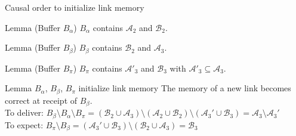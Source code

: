 \documentclass[10pt, xcolor={usenames, dvipsnames}]{beamer}
\begin{document}
\begin{frame}{Causal order to initialize link memory}

  \begin{center}
    
  \end{center}

  \vspace{-1em}

  \begin{minipage}{0.325\textwidth}
    \begin{block}{Lemma (Buffer $B_\alpha$)}
      $B_\alpha$ contains $\mathcal{A}_2$ and $\mathcal{B}_2$.
    \end{block}
  \end{minipage}
  \begin{minipage}{0.325\textwidth}
    \begin{block}{Lemma (Buffer $B_\beta$)}
      $B_\beta$ contains $\mathcal{B}_2$ and $\mathcal{A}_3$.
    \end{block}
  \end{minipage}
  \begin{minipage}{0.325\textwidth}
    \begin{block}{Lemma (Buffer $B_\pi$)}
      $B_\pi$ contains $\mathcal{A'}_3$ and $\mathcal{B}_3$ with 
      $\mathcal{A}'_3 \subseteq \mathcal{A}_3$.
    \end{block}
  \end{minipage}
  
  \begin{block}{Lemma $B_\alpha$, $B_\beta$, $B_\pi$ initialize link memory}
    The memory of a new link becomes correct at receipt of $B_\beta$. \\
    To deliver:
    $B_\beta \setminus B_\alpha \setminus B_\pi = (\mathcal{B}_2 \cup
    \mathcal{A}_3) \setminus (\mathcal{A}_2 \cup \mathcal{B}_2) \setminus
    (\mathcal{A}_3' \cup \mathcal{B}_3) = \mathcal{A}_3 \setminus
    \mathcal{A}_3'$\\
    To expect:
    $B_\pi \setminus B_\beta = (\mathcal{A}_3' \cup \mathcal{B}_3) \setminus
    (\mathcal{B}_2 \cup \mathcal{A}_3) = \mathcal{B}_3$

  \end{block}   
    
\end{frame}
\end{document}
